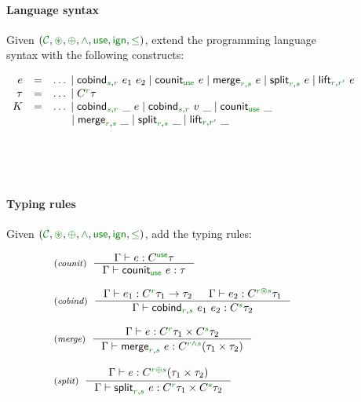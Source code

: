 
\begin{figure}[t]
\paragraph{Language syntax}
Given $(\C, \cseq, \cpar, \czip, \cunit, \czero, \cleq)$, extend the programming language
syntax with the following constructs:

\begin{equation*}
\begin{array}{rcl}
  e &  =  &\ldots \sep\ident{cobind}_{\cclrd{s},\cclrd{r}}~e_1~e_2 \sep \ident{counit}_{\cunit}~e \sep \ident{merge}_{\cclrd{r},\cclrd{s}}~e
         \sep \ident{split}_{\cclrd{r},\cclrd{s}}~e \sep \ident{lift}_{\cclrd{r},\cclrd{r'}}~e \\
  \tau &  = &\ldots \sep \ctyp{\cclrd{r}}{\tau} \\
  K  & = &\ldots \sep \ident{cobind}_{\cclrd{s},\cclrd{r}}~\_~e \sep \ident{cobind}_{\cclrd{s},\cclrd{r}}~v~\_ \sep \ident{counit}_{\cunit}~\_ \\
    && \hspace{1.4em} \sep \ident{merge}_{\cclrd{r},\cclrd{s}}~\_
           \sep \ident{split}_{\cclrd{r},\cclrd{s}}~\_ \sep \ident{lift}_{\cclrd{r},\cclrd{r'}}~\_ \\
\end{array}
\end{equation*}

~

~

\paragraph{Typing rules}
Given $(\C, \cseq, \cpar, \czip, \cunit, \czero, \cleq)$, add the typing rules:

\begin{equation*}
\begin{array}{l}
\tyrule{counit}
  {\Gamma \vdash e : \ctyp{\cunit}{\tau}}
  {\Gamma \vdash \ident{counit}_{\cunit}~e : \tau} \\
\\
\tyrule{cobind}
  {\Gamma \vdash e_1 : \ctyp{\cclrd{r}}{\tau_1} \rightarrow \tau_2 & \Gamma \vdash e_2 : \ctyp{\cclrd{r}\cseq\cclrd{s}}{\tau_1} }
  {\Gamma \vdash \ident{cobind}_{\cclrd{r}, \cclrd{s}}~e_1~e_2 : \ctyp{\cclrd{s}}{\tau_2}} \\
  \\
\tyrule{merge}
  {\Gamma \vdash  e : \ctyp{\cclrd{r}}{\tau_1} \times \ctyp{\cclrd{s}}{\tau_2} }
  {\Gamma \vdash  \ident{merge}_{\cclrd{r},\cclrd{s}}~e : \ctyp{\cclrd{r}\czip\cclrd{s}}{(\tau_1 \times \tau_2)} }\\
    \\
\tyrule{split}
  {\Gamma \vdash  e : \ctyp{\cclrd{r}\cpar\cclrd{s}}{(\tau_1 \times \tau_2)} }
  {\Gamma \vdash  \ident{split}_{\cclrd{r},\cclrd{s}}~e : \ctyp{\cclrd{r}}{\tau_1} \times \ctyp{\cclrd{s}}{\tau_2}} \\
\end{array}
\end{equation*}


\end{figure}
